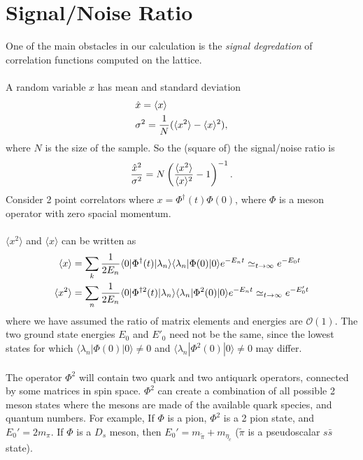 \documentclass[a4paper,10pt]{article}
\numberwithin{equation}{section}
\begin{document}
\section{Signal/Noise Ratio}
\label{sec:signalnoise}

One of the main obstacles in our calculation is the \textit{signal degredation} of correlation functions computed on the lattice.
\\ \\
A random variable $x$ has mean and standard deviation
\begin{align}
	&\hat{x} = \langle x \rangle \\
	&\sigma^2 = {1\over N} ( \langle x^2 \rangle - \langle x \rangle^2 ),
\end{align}
where $N$ is the size of the sample. So the (square of) the signal/noise ratio is
\begin{align}
	{\hat{x}^2\over \sigma^2} = N \left( {\langle x^2 \rangle \over \langle x \rangle^2} - 1 \right) ^{-1}.
\end{align}
Consider 2 point correlators where $x = \Phi^{\dagger}(t) \Phi(0)$, where $\Phi$ is a meson operator with zero spacial momentum.
\\ \\
$\langle x^2 \rangle$ and $\langle x \rangle$ can be written as
\begin{align}
	\langle x \rangle &= \sum_k {1\over 2E_n} \langle 0 | \Phi^{\dagger}(t) | \lambda_n \rangle \langle \lambda_n | \Phi(0) | 0 \rangle e^{-E_n t} \simeq_{t\to\infty} e^{-E_0 t}\\
	\langle x^2 \rangle &= \sum_n {1\over 2E_n} \langle 0 | \Phi^{\dagger 2}(t) | \lambda_n \rangle \langle \lambda_n | \Phi^2(0) | 0 \rangle e^{-E_n t} \simeq_{t\to\infty} e^{-E'_0 t}
\end{align}
where we have assumed the ratio of matrix elements and energies are $\mathcal{O}(1)$. The two ground state energies $E_0$ and $E'_0$ need not be the same, since the lowest states for which 
$\langle \lambda_n | \Phi(0) | 0 \rangle \neq 0$ and $\langle \lambda_n | \Phi^2(0) | 0 \rangle \neq 0$ may differ. 
\\ \\
The operator $\Phi^2$ will contain two quark and two antiquark operators, connected by some matrices in spin space. $\Phi^2$ can create a combination of all possible 2 meson states where the mesons are made of the available quark species, and quantum numbers. For example, If $\Phi$ is a pion, $\Phi^2$ is a 2 pion state, and $E_0' = 2m_{\pi}$. If $\Phi$ is a $D_s$ meson, then $E_0' = m_{\tilde{\pi}} + m_{\eta_c}$ ($\tilde{\pi}$ is a pseudoscalar $s\bar{s}$ state).
\end{document}

